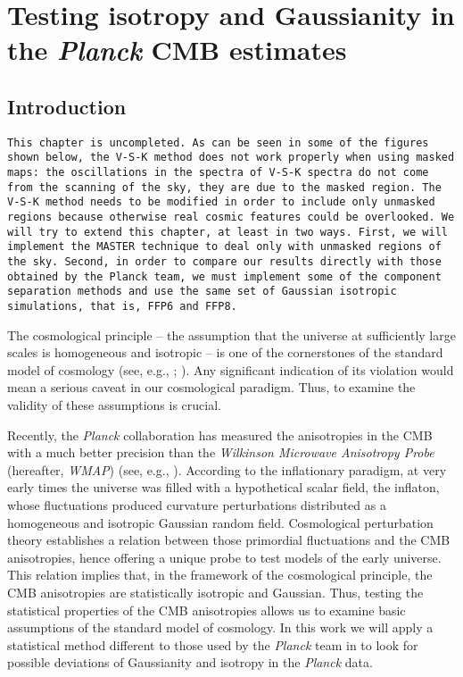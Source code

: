 \chapter{Testing isotropy and Gaussianity in the \textit{Planck} CMB estimates}
\label{chapter:8}

\section{Introduction} 

\texttt{This chapter is uncompleted. As can be seen in some of the figures shown below, the V-S-K method does not work properly when using masked maps: the oscillations in the spectra of V-S-K spectra do not come from the scanning of the sky, they are due to the masked region. The V-S-K method needs to be modified in order to include only unmasked regions because otherwise real cosmic features could be overlooked. We will try to extend this chapter, at least in two ways. First, we will implement the MASTER technique to deal only with unmasked regions of the sky. Second, in order to compare our results directly with those obtained by the Planck team, we must implement some of the component separation methods and use the same set of Gaussian isotropic simulations, that is, FFP6 and FFP8.}

The cosmological principle -- the assumption that the universe at sufficiently large scales is homogeneous and isotropic -- is one of the cornerstones of the standard model of cosmology (see, e.g., \cite{Robertson1935}; \cite{Walker1937}). Any significant indication of its violation would mean a serious caveat in our cosmological paradigm. Thus, to examine the validity of these assumptions is crucial. 

Recently, the \textit{Planck} collaboration has measured the anisotropies in the CMB with a much better precision than the \textit{Wilkinson Microwave Anisotropy Probe} (hereafter, \textit{WMAP}) (see, e.g., \cite{Spergel2003b}). According to the inflationary paradigm, at very early times the universe was filled with a hypothetical scalar field, the inflaton, whose fluctuations produced curvature perturbations distributed as a homogeneous and isotropic Gaussian random field. Cosmological perturbation theory establishes a relation between those primordial fluctuations and the CMB anisotropies, hence offering a unique probe to test models of the early universe. This relation implies that, in the framework of the cosmological principle, the CMB anisotropies are  statistically isotropic and Gaussian. Thus, testing the statistical properties of the CMB anisotropies allows us to examine  basic assumptions of the standard model of cosmology. In this work we will apply a statistical method different to those used by the \textit{Planck} team in \cite{PlanckXXIII} to look for possible deviations of Gaussianity and isotropy in the \textit{Planck} data.

